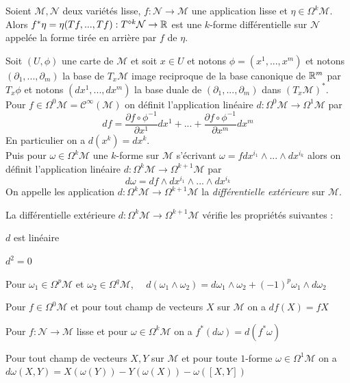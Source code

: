 \documentclass[12pt, a4paper]{book}
\begin{document}
\begin{defi}
Soient $\mathcal{M}, \mathcal{N}$ deux variétés lisse, $f:\mathcal{N} \to \mathcal{M}$ une application lisse et $\eta \in \Omega^k\mathcal{M}$. Alors $f^*\eta = \eta (Tf, ..., Tf) : T^{\diamond k}\mathcal{N} \to \mathbb{R}$ est une $k$-forme différentielle sur $\mathcal{N}$ appelée la forme tirée en arrière par $f$ de $\eta$. \\
\end{defi}

\begin{defi}
Soit $(U, \phi)$ une carte de $\mathcal{M}$ et soit $x\in U$ et notons $\phi = (x^1, ..., x^m)$ et notons $(\partial_1, ..., \partial_m)$ la base de $T_x\mathcal{M}$ image reciproque de la base canonique de $\mathbb{R}^m$ par $T_x\phi$ et notons $(dx^1, ..., dx^m)$ la base duale de $(\partial_1, ..., \partial_m)$ dans $(T_x\mathcal{M})^*$. Pour $f\in \Omega^0\mathcal{M} = \mathscr{C}^\infty(\mathcal{M})$ on définit l'application linéaire $d : \Omega^0\mathcal{M} \to \Omega^1\mathcal{M}$ par 
$$df = \frac{\partial f \circ \phi^{-1}}{\partial x^1}dx^1 +...+ \frac{\partial f \circ \phi^{-1}}{\partial x^m}dx^m$$
En particulier on a $d(x^k) = dx^k$. \\
Puis pour $\omega \in \Omega^k\mathcal{M}$ une $k$-forme sur $\mathcal{M}$ s'écrivant $\omega = f dx^{i_1} \wedge ... \wedge dx^{i_k}$ alors on définit l'application linéaire $d: \Omega^k\mathcal{M} \to \Omega^{k+1}\mathcal{M}$ par 
$$d\omega = df \wedge dx^{i_1} \wedge ... \wedge dx^{i_k}$$
On appelle les application $d: \Omega^k\mathcal{M} \to \Omega^{k+1}\mathcal{M}$ la \emph{différentielle extérieure} sur $\mathcal{M}$.
\end{defi}

\begin{pro}
La différentielle extérieure $d: \Omega^k\mathcal{M} \to \Omega^{k+1}\mathcal{M}$ vérifie les propriétés suivantes :
\be
	\item $d$ est linéaire
	\item $d^2 = 0$ 
	\item Pour $\omega_1 \in \Omega^p\mathcal{M}$ et $\omega_2 \in \Omega^q\mathcal{M}$, $\quad d(\omega_1 \wedge \omega_2) = d\omega_1 \wedge \omega_2 + (-1)^p\omega_1 \wedge d\omega_2$
	\item Pour $f\in \Omega^0\mathcal{M}$ et pour tout champ de vecteurs $X$ sur $\mathcal{M}$ on a $df(X) = fX$
	\item Pour $f:\mathcal{N} \to \mathcal{M}$ lisse et pour $\omega \in \Omega^k\mathcal{M}$ on a $f^*(d\omega) = d(f^*\omega)$
	\item Pour tout champ de vecteurs $X,Y$ sur $\mathcal{M}$ et pour toute $1$-forme $\omega \in \Omega^1\mathcal{M}$ on a $d\omega(X,Y) = X(\omega(Y)) - Y(\omega(X)) - \omega([X, Y])$
\ee
\end{pro}
\end{document}
